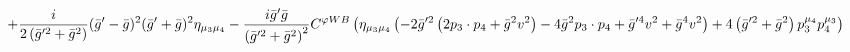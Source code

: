 %
\begin{dmath*}
%
  +  \frac{i}{2 \left({\bar g}^{\prime 2} + {\bar g}{}^2\right)}({\bar g}^\prime - {\bar g}{})^2 ({\bar g}^\prime + {\bar g}{})^2 \eta_{\mu_3 \mu_4}  -  \frac{i {\bar g}^\prime {\bar g}{}}{\left({\bar g}^{\prime 2} + {\bar g}{}^2\right)^2}C^{ \varphi  WB} \left(\eta_{\mu_3 \mu_4} \left( - 2 {\bar g}^{\prime 2} \left(2 p_{3}\nobreak\cdot\nobreak{}p_{4} + {\bar g}{}^2 v^2\right) - 4 {\bar g}{}^2 p_{3}\nobreak\cdot\nobreak{}p_{4} + {\bar g}^{\prime 4} v^2 + {\bar g}{}^4 v^2\right) + 4 \left({\bar g}^{\prime 2} + {\bar g}{}^2\right) p_3^{\mu_4} p_4^{\mu_3}\right)
%
\end{dmath*}
%
